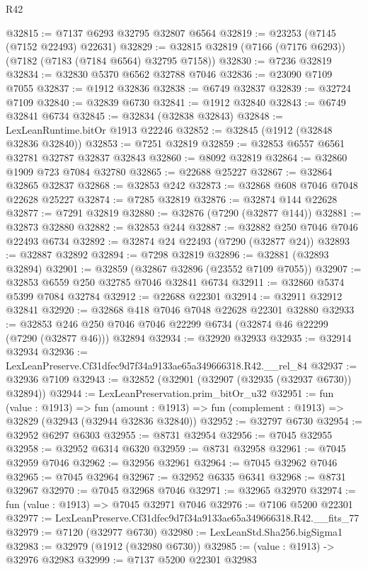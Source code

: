 \begin{lexlean}{R42}
\begin{coremodule}
{@32815 := @7137 @6293 @32795 @32807 @6564
@32819 := @23253 (@7145 (@7152 @22493) @22631)
@32829 := @32815 @32819 (@7166 (@7176 @6293)) (@7182 (@7183 (@7184 @6564) @32795 @7158))
@32830 := @7236 @32819
@32834 := @32830 @5370 @6562 @32788 @7046
@32836 := @23090 @7109 @7055
@32837 := @1912 @32836
@32838 := @6749 @32837
@32839 := @32724 @7109
@32840 := @32839 @6730
@32841 := @1912 @32840
@32843 := @6749 @32841 @6734
@32845 := @32834 (@32838 @32843)
@32848 := LexLeanRuntime.bitOr @1913 @22246
@32852 := @32845 (@1912 (@32848 @32836 @32840))
@32853 := @7251 @32819
@32859 := @32853 @6557 @6561 @32781 @32787 @32837 @32843
@32860 := @8092 @32819
@32864 := @32860 @1909 @723 @7084 @32780
@32865 := @22688 @25227
@32867 := @32864 @32865 @32837
@32868 := @32853 @242
@32873 := @32868 @608 @7046 @7048 @22628 @25227
@32874 := @7285 @32819
@32876 := @32874 @144 @22628
@32877 := @7291 @32819
@32880 := @32876 (@7290 (@32877 @144))
@32881 := @32873 @32880
@32882 := @32853 @244
@32887 := @32882 @250 @7046 @7046 @22493 @6734
@32892 := @32874 @24 @22493 (@7290 (@32877 @24))
@32893 := @32887 @32892
@32894 := @7298 @32819
@32896 := @32881 (@32893 @32894)
@32901 := @32859 (@32867 @32896 (@23552 @7109 @7055))
@32907 := @32853 @6559 @250 @32785 @7046 @32841 @6734
@32911 := @32860 @5374 @5399 @7084 @32784
@32912 := @22688 @22301
@32914 := @32911 @32912 @32841
@32920 := @32868 @418 @7046 @7048 @22628 @22301 @32880
@32933 := @32853 @246 @250 @7046 @7046 @22299 @6734 (@32874 @46 @22299 (@7290 (@32877 @46))) @32894
@32934 := @32920 @32933
@32935 := @32914 @32934
@32936 := LexLeanPreserve.Cf31dfec9d7f34a9133ae65a349666318.R42.__rel_84
@32937 := @32936 @7109
@32943 := @32852 (@32901 (@32907 (@32935 (@32937 @6730)) @32894))
@32944 := LexLeanPreservation.prim_bitOr_u32
@32951 := fun (value : @1913) =>
  fun (amount : @1913) => fun (complement : @1913) => @32829 (@32943 (@32944 @32836 @32840))
@32952 := @32797 @6730
@32954 := @32952 @6297 @6303
@32955 := @8731 @32954
@32956 := @7045 @32955
@32958 := @32952 @6314 @6320
@32959 := @8731 @32958
@32961 := @7045 @32959 @7046
@32962 := @32956 @32961
@32964 := @7045 @32962 @7046
@32965 := @7045 @32964
@32967 := @32952 @6335 @6341
@32968 := @8731 @32967
@32970 := @7045 @32968 @7046
@32971 := @32965 @32970
@32974 := fun (value : @1913) => @7045 @32971 @7046
@32976 := @7106 @5200 @22301
@32977 := LexLeanPreserve.Cf31dfec9d7f34a9133ae65a349666318.R42.__fits_77
@32979 := @7120 (@32977 @6730)
@32980 := LexLeanStd.Sha256.bigSigma1
@32983 := @32979 (@1912 (@32980 @6730))
@32985 := (value : @1913) -> @32976 @32983
@32999 := @7137
    @5200
    @22301
    @32983
}
\end{coremodule}
\end{lexlean}
